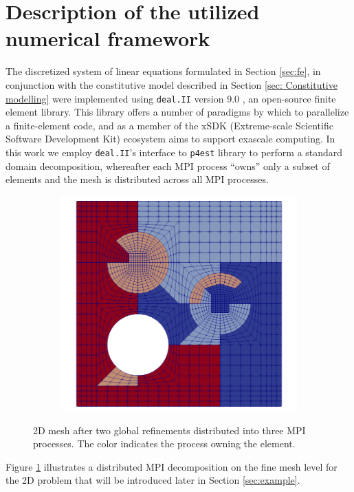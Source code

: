 \documentclass[times,doublespace]{nmeauth}
\newcommand{\changeJP}[1]{#1}
\begin{document}
\section{\changeJP{Description of the utilized numerical framework}
\label{sec: Description of numerical framework}
}

\changeJP{
The discretized system of linear equations formulated in Section \ref{sec:fe}, in conjunction with the constitutive model described in Section \ref{sec: Constitutive modelling} were implemented using \texttt{deal.II} version 9.0 \cite{dealII90}, an open-source finite element library.
This library offers a number of paradigms by which to parallelize a finite-element code, and as a member of the xSDK (Extreme-scale Scientific Software Development Kit) ecosystem \citep{Bartlett2017b} aims to support exascale computing.
In this work we employ \texttt{deal.II}'s interface to \texttt{p4est} \cite{p4est} library to perform a standard domain decomposition, whereafter each MPI process ``owns'' only a subset of elements and the mesh is distributed across all MPI processes.
%
\begin{figure}[!ht]
  \centering
  \begin{subfigure}[b]{0.8\textwidth}
    \centering
    \includegraphics[width=\textwidth]{fine_level_2d.png}
  \end{subfigure}
  \caption{2D mesh after two global refinements distributed into three MPI processes. The color indicates the process owning the element.}%
  \label{fig:miehe_fine_level}
\end{figure}
%
%
Figure \ref{fig:miehe_fine_level} illustrates a distributed MPI decomposition on the fine mesh level for the 2D problem that will be introduced later in Section \ref{sec:example}.
}
\end{document}
